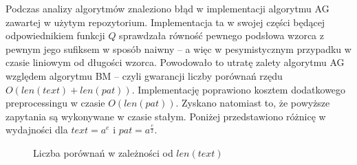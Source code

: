 Podczas analizy algorytmów znaleziono błąd w implementacji algorytmu AG zawartej w użytym repozytorium. Implementacja ta w swojej części będącej odpowiednikiem funkcji $Q$ sprawdzała równość pewnego podsłowa wzorca z pewnym jego sufiksem w sposób naiwny -- a więc w pesymistycznym przypadku w czasie liniowym od długości wzorca. Powodowało to utratę zalety algorytmu AG względem algorytmu BM -- czyli gwarancji liczby porównań rzędu $O(len(text)+len(pat))$. Implementację poprawiono kosztem dodatkowego preprocessingu w czasie $O(len(pat))$. Zyskano natomiast to, że powyższe zapytania są wykonywane w czasie stałym. Poniżej przedstawiono różnicę w wydajności dla $text = a^{e}$ i $pat = a^{\frac{e}{2}}$.

\begin{figure}[h]
    \centering
    
    \hfill
    \caption{Liczba porównań w zależności od $len(text)$}
    \label{fig:result_bm_hard_pat_len(text)2_plot_broken_fixed_AG}
\end{figure}